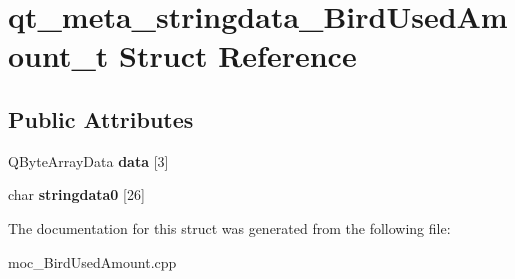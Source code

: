 \hypertarget{structqt__meta__stringdata__BirdUsedAmount__t}{}\section{qt\+\_\+meta\+\_\+stringdata\+\_\+\+Bird\+Used\+Amount\+\_\+t Struct Reference}
\label{structqt__meta__stringdata__BirdUsedAmount__t}
\subsection*{Public Attributes}
\begin{DoxyCompactItemize}
\item 
Q\+Byte\+Array\+Data {\bfseries data} \mbox{[}3\mbox{]}\hypertarget{structqt__meta__stringdata__BirdUsedAmount__t_a420170ebae5a2ea1aa5444671bcc9eee}{}\label{structqt__meta__stringdata__BirdUsedAmount__t_a420170ebae5a2ea1aa5444671bcc9eee}

\item 
char {\bfseries stringdata0} \mbox{[}26\mbox{]}\hypertarget{structqt__meta__stringdata__BirdUsedAmount__t_ab49930d2238024145b2ab31abe5d9b02}{}\label{structqt__meta__stringdata__BirdUsedAmount__t_ab49930d2238024145b2ab31abe5d9b02}

\end{DoxyCompactItemize}


The documentation for this struct was generated from the following file\+:\begin{DoxyCompactItemize}
\item 
moc\+\_\+\+Bird\+Used\+Amount.\+cpp\end{DoxyCompactItemize}
